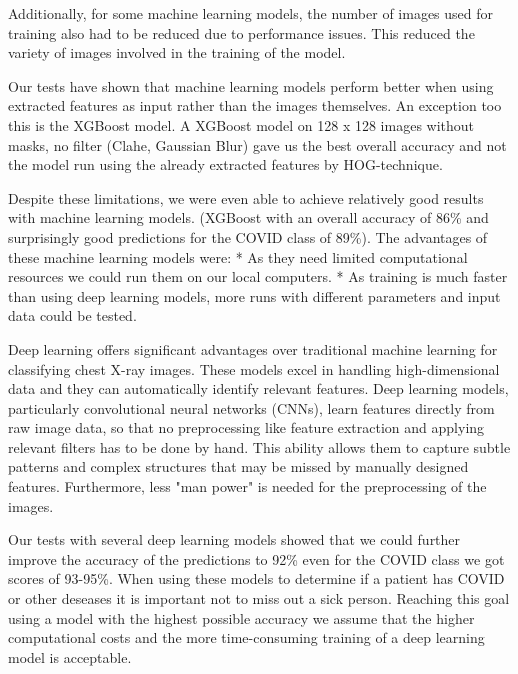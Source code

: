 \documentclass{article}
\begin{document}
Additionally, for some machine learning models, the number of images used for training also had to be reduced due to performance issues. This reduced the variety of images involved in the training of the model. 

Our tests have shown that machine learning models perform better when using extracted features as input rather than the images themselves. An exception too this is the XGBoost model. A XGBoost model on 128 x 128 images without masks, no filter (Clahe, Gaussian Blur) gave us the best overall accuracy and not the model run using the already extracted features by HOG-technique. 

Despite these limitations, we were even able to achieve relatively good results with machine learning models. (XGBoost with an overall accuracy of 86\% and surprisingly good predictions for the COVID class of 89\%). 
The advantages of these machine learning models were: 
* As they need limited computational resources we could run them on our local computers.
* As training is much faster than using deep learning models, more runs with different parameters and input data could be tested. 

Deep learning offers significant advantages over traditional machine learning for classifying chest X-ray images. These models excel in handling high-dimensional data and they can automatically identify relevant features. Deep learning models, particularly convolutional neural networks (CNNs), learn features directly from raw image data, so that no preprocessing like feature extraction and applying relevant filters has to be done by hand. This ability allows them to capture subtle patterns and complex structures that may be missed by manually designed features. Furthermore, less "man power" is needed for the preprocessing of the images. 

Our tests with several deep learning models showed that we could further improve the accuracy of the predictions to 92\% even for the COVID class we got scores of 93-95\%. When using these models to determine if a patient has COVID or other deseases it is important not to miss out a sick person. Reaching this goal using a model with the highest possible accuracy we assume that the higher computational costs and the more time-consuming training of a deep learning model is acceptable.\\

\end{document}
